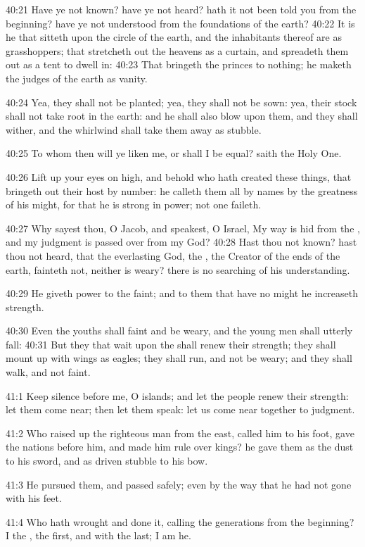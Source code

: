 40:21 Have ye not known? have ye not heard? hath it not been told you from the beginning? have ye not understood from the foundations of the earth?  40:22 It is he that sitteth upon the circle of the earth, and the inhabitants thereof are as grasshoppers; that stretcheth out the heavens as a curtain, and spreadeth them out as a tent to dwell in: 40:23 That bringeth the princes to nothing; he maketh the judges of the earth as vanity.

40:24 Yea, they shall not be planted; yea, they shall not be sown: yea, their stock shall not take root in the earth: and he shall also blow upon them, and they shall wither, and the whirlwind shall take them away as stubble.

40:25 To whom then will ye liken me, or shall I be equal? saith the Holy One.

40:26 Lift up your eyes on high, and behold who hath created these things, that bringeth out their host by number: he calleth them all by names by the greatness of his might, for that he is strong in power; not one faileth.

40:27 Why sayest thou, O Jacob, and speakest, O Israel, My way is hid from the \LORD, and my judgment is passed over from my God?  40:28 Hast thou not known? hast thou not heard, that the everlasting God, the \LORD, the Creator of the ends of the earth, fainteth not, neither is weary? there is no searching of his understanding.

40:29 He giveth power to the faint; and to them that have no might he increaseth strength.

40:30 Even the youths shall faint and be weary, and the young men shall utterly fall: 40:31 But they that wait upon the \LORD shall renew their strength; they shall mount up with wings as eagles; they shall run, and not be weary; and they shall walk, and not faint.

41:1 Keep silence before me, O islands; and let the people renew their strength: let them come near; then let them speak: let us come near together to judgment.

41:2 Who raised up the righteous man from the east, called him to his foot, gave the nations before him, and made him rule over kings? he gave them as the dust to his sword, and as driven stubble to his bow.

41:3 He pursued them, and passed safely; even by the way that he had not gone with his feet.

41:4 Who hath wrought and done it, calling the generations from the beginning? I the \LORD, the first, and with the last; I am he.


